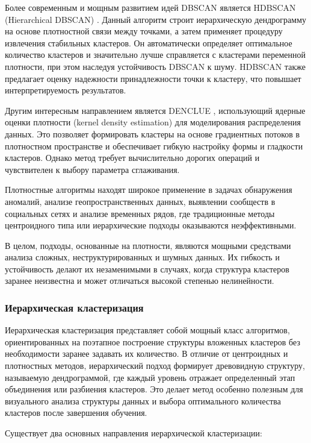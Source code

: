             Более современным и мощным развитием идей DBSCAN является HDBSCAN (Hierarchical DBSCAN) \cite{Maarten2022HDBSCAN}. Данный алгоритм строит иерархическую дендрограмму на основе плотностной связи между точками, а затем применяет процедуру извлечения стабильных кластеров. Он автоматически определяет оптимальное количество кластеров и значительно лучше справляется с кластерами переменной плотности, при этом наследуя устойчивость DBSCAN к шуму. HDBSCAN также предлагает оценку надежности принадлежности точки к кластеру, что повышает интерпретируемость результатов.

            Другим интересным направлением является DENCLUE \cite{DENCLUE}, использующий ядерные оценки плотности (kernel density estimation) для моделирования распределения данных. Это позволяет формировать кластеры на основе градиентных потоков в плотностном пространстве и обеспечивает гибкую настройку формы и гладкости кластеров. Однако метод требует вычислительно дорогих операций и чувствителен к выбору параметра сглаживания.

            Плотностные алгоритмы находят широкое применение в задачах обнаружения аномалий, анализе геопространственных данных, выявлении сообществ в социальных сетях и анализе временных рядов, где традиционные методы центроидного типа или иерархические подходы оказываются неэффективными.

            В целом, подходы, основанные на плотности, являются мощными средствами анализа сложных, неструктурированных и шумных данных. Их гибкость и устойчивость делают их незаменимыми в случаях, когда структура кластеров заранее неизвестна и может отличаться высокой степенью нелинейности.

        \subsubsection{Иерархическая кластеризация}
            Иерархическая кластеризация представляет собой мощный класс алгоритмов, ориентированных на поэтапное построение структуры вложенных кластеров без необходимости заранее задавать их количество. В отличие от центроидных и плотностных методов, иерархический подход формирует древовидную структуру, называемую дендрограммой, где каждый уровень отражает определенный этап объединения или разбиения кластеров. Это делает метод особенно полезным для визуального анализа структуры данных и выбора оптимального количества кластеров после завершения обучения.

            Существует два основных направления иерархической кластеризации:

